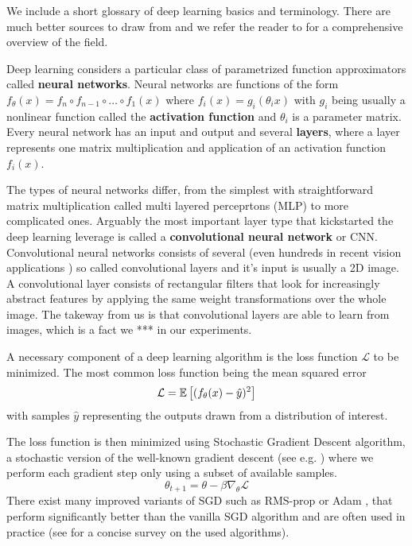 We include a short glossary of deep learning basics and terminology. There are much better sources to draw from and we refer the reader to \cite{deeplearning multiple} for a comprehensive overview of the field.

Deep learning considers a particular class of parametrized function approximators called \textbf{neural networks}. 
Neural networks are functions of the form $f_\theta(x) = f_n \circ f_{n-1} \circ\hdots\circ  f_1(x)$ where $f_i(x) = g_i(\theta_i x)$ with $g_i$ being usually a nonlinear function called the \textbf{activation function} and $\theta_i$ is a parameter matrix. Every neural network has an input and output and several \textbf{layers}, where a layer represents one matrix multiplication and application of an activation function $f_i(x)$.

The types of neural networks differ, from the simplest with straightforward matrix multiplication called multi layered perceprtons (MLP) to more complicated ones. Arguably the most important layer type that kickstarted the deep learning leverage is called a \textbf{convolutional neural network} or CNN. Convolutional neural networks consists of several (even hundreds in recent vision applications \cite{...}) so called convolutional layers and it's input is usually a 2D image. A convolutional layer consists of rectangular filters that look for increasingly abstract features by applying the same weight transformations over the whole image. The takeway from us is that convolutional layers are able to learn from images, which is a fact we *** in our experiments.

A necessary component of a deep learning algorithm is the loss function $\mathcal{L}$ to be minimized. The most common loss function being the mean squared error
\begin{equation*}
\mathcal{L} = \mathbb{E}\left[ {(f_\theta(x) - \hat{y})^2} \right]
\end{equation*}
with samples $\hat{y}$ representing the outputs drawn from a distribution of interest. 

The loss function is then minimized using Stochastic Gradient Descent algorithm, a stochastic version of the well-known gradient descent (see e.g. \citet{boyd2004convex}) where we perform each gradient step only using a subset of available samples. 
\begin{equation}
\theta_{t+1} = \theta - \beta\nabla_\theta \mathcal{L}
\end{equation}
There exist many improved variants of SGD such as RMS-prop \cite{...} or Adam \cite{...}, that perform significantly better than the vanilla SGD algorithm and are often used in practice (see \cite{survey} for a concise survey on the used algorithms).


